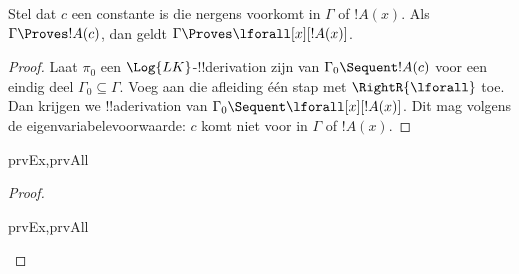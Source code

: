 \documentclass[openany]{memoir}
\begin{document}
\begin{thm}
 Stel dat $c$ een constante is die
nergens voorkomt in $\Gamma$ of $!A(x)$. Als $\Gamma \Proves !A(c)$,
dan geldt $\Gamma \Proves \lforall[x][!A(x)]$.
\end{thm}

\begin{proof}
Laat $\pi_0$ een $\Log{LK}$-!!{derivation} zijn van $\Gamma_0 \Sequent
!A(c)$ voor een eindig deel $\Gamma_0 \subseteq \Gamma$. Voeg aan die
afleiding één stap met $\RightR{\lforall}$ toe. Dan krijgen we !!a{derivation} van $\Gamma_0
\Sequent \lforall[x][!A(x)]$. Dit mag volgens de
eigenvariabelevoorwaarde: $c$ komt niet voor in $\Gamma$ of $!A(x)$.
\end{proof}

\begin{prop}
\begin{tagenumerate}{prvEx,prvAll}
\end{tagenumerate}
\end{prop}

\begin{proof}
\begin{tagenumerate}{prvEx,prvAll}
\end{tagenumerate}
\end{proof}
\endgroup

\begingroup
\def\olfilename{OLP-0081}
\def\olfilepath{content/first-order-logic/sequent-calculus/}
\hypertarget{unit-OLP-0081}{}
\end{document}
